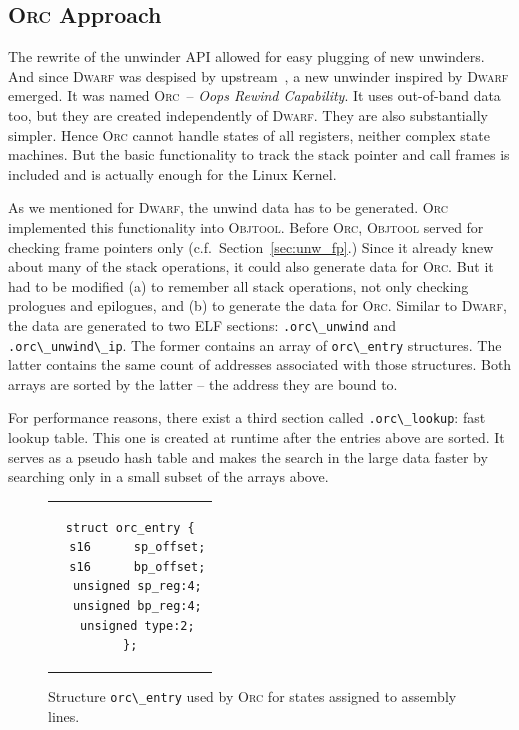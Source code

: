 \documentclass[10pt]{llncs}
\newcommand{\code}[2][]{\lstinline[columns=fullflexible, #1]$#2$}
\newcommand{\dwarf}{\textsc{Dwarf}\xspace}
\newcommand{\objtool}{\textsc{Objtool}\xspace}
\newcommand{\orc}{\textsc{Orc}\xspace}
\begin{document}
\subsection{\orc Approach} \label{sec:unw_orc}
The rewrite of the unwinder API allowed for easy plugging of new unwinders.
And since \dwarf was despised by upstream~\cite{kill_dwarf2}, a new
unwinder inspired by \dwarf emerged. It was named \orc\ -- \textit{Oops Rewind
Capability}. It uses out-of-band data too, but they are created independently
of \dwarf. They are also substantially simpler. Hence \orc cannot handle
states of all registers, neither complex state machines.  But the basic
functionality to track the stack pointer and call frames is included and is
actually enough for the Linux Kernel.

As we mentioned for \dwarf, the unwind data has to be generated. \orc
implemented this functionality into \objtool. Before \orc, \objtool served
for checking frame pointers only (c.f.\ Section~\ref{sec:unw_fp}.) Since it
already knew about many of the stack operations, it could also generate data
for \orc. But it had to be modified (a) to remember all stack operations, not
only checking prologues and epilogues, and (b) to generate the data for \orc.
Similar to \dwarf, the data are generated to two ELF sections:
\code{.orc\_unwind} and \code{.orc\_unwind\_ip}.  The former contains an array
of \code{orc\_entry} structures. The latter contains the same count of
addresses associated with those structures. Both arrays are sorted by the
latter -- the address they are bound to.

For performance reasons, there exist a third section called
\code{.orc\_lookup}: fast lookup table. This one is created at runtime after
the entries above are sorted. It serves as a pseudo hash table and makes the
search in the large data faster by searching only in a small subset of the
arrays above.

\begin{figure}[htb]
  \begin{center}
    \begin{tabular}{c}
      \begin{lstlisting}
struct orc_entry {
  s16      sp_offset;
  s16      bp_offset;
  unsigned sp_reg:4;
  unsigned bp_reg:4;
  unsigned type:2;
};
      \end{lstlisting}
    \end{tabular}
  \end{center}
    \caption{Structure \code{orc\_entry} used by \orc for states assigned to
    assembly lines.}
  \label{fig:orc_struct}
\end{figure}
\end{document}
